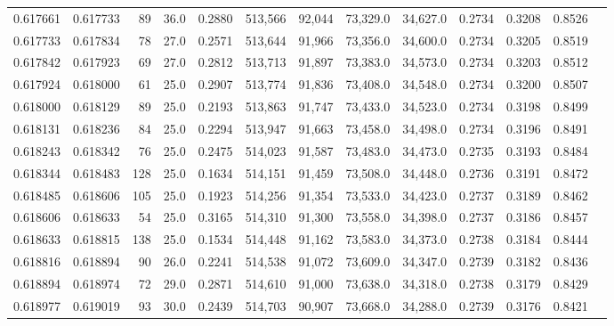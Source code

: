 \begin{tabular}{rrrrrrrrrrrrr}
0.617661 & 0.617733 &    89 & 36.0 &                                     0.2880 & 513,566 &  92,044 &  73,329.0 &  34,627.0 & 0.2734 & 0.3208 & 0.8526 \\
0.617733 & 0.617834 &    78 & 27.0 &                                     0.2571 & 513,644 &  91,966 &  73,356.0 &  34,600.0 & 0.2734 & 0.3205 & 0.8519 \\
0.617842 & 0.617923 &    69 & 27.0 &                                     0.2812 & 513,713 &  91,897 &  73,383.0 &  34,573.0 & 0.2734 & 0.3203 & 0.8512 \\
0.617924 & 0.618000 &    61 & 25.0 &                                     0.2907 & 513,774 &  91,836 &  73,408.0 &  34,548.0 & 0.2734 & 0.3200 & 0.8507 \\
0.618000 & 0.618129 &    89 & 25.0 &                                     0.2193 & 513,863 &  91,747 &  73,433.0 &  34,523.0 & 0.2734 & 0.3198 & 0.8499 \\
0.618131 & 0.618236 &    84 & 25.0 &                                     0.2294 & 513,947 &  91,663 &  73,458.0 &  34,498.0 & 0.2734 & 0.3196 & 0.8491 \\
0.618243 & 0.618342 &    76 & 25.0 &                                     0.2475 & 514,023 &  91,587 &  73,483.0 &  34,473.0 & 0.2735 & 0.3193 & 0.8484 \\
0.618344 & 0.618483 &   128 & 25.0 &                                     0.1634 & 514,151 &  91,459 &  73,508.0 &  34,448.0 & 0.2736 & 0.3191 & 0.8472 \\
0.618485 & 0.618606 &   105 & 25.0 &                                     0.1923 & 514,256 &  91,354 &  73,533.0 &  34,423.0 & 0.2737 & 0.3189 & 0.8462 \\
0.618606 & 0.618633 &    54 & 25.0 &                                     0.3165 & 514,310 &  91,300 &  73,558.0 &  34,398.0 & 0.2737 & 0.3186 & 0.8457 \\
0.618633 & 0.618815 &   138 & 25.0 &                                     0.1534 & 514,448 &  91,162 &  73,583.0 &  34,373.0 & 0.2738 & 0.3184 & 0.8444 \\
0.618816 & 0.618894 &    90 & 26.0 &                                     0.2241 & 514,538 &  91,072 &  73,609.0 &  34,347.0 & 0.2739 & 0.3182 & 0.8436 \\
0.618894 & 0.618974 &    72 & 29.0 &                                     0.2871 & 514,610 &  91,000 &  73,638.0 &  34,318.0 & 0.2738 & 0.3179 & 0.8429 \\
0.618977 & 0.619019 &    93 & 30.0 &                                     0.2439 & 514,703 &  90,907 &  73,668.0 &  34,288.0 & 0.2739 & 0.3176 & 0.8421 \\

\end{tabular}
